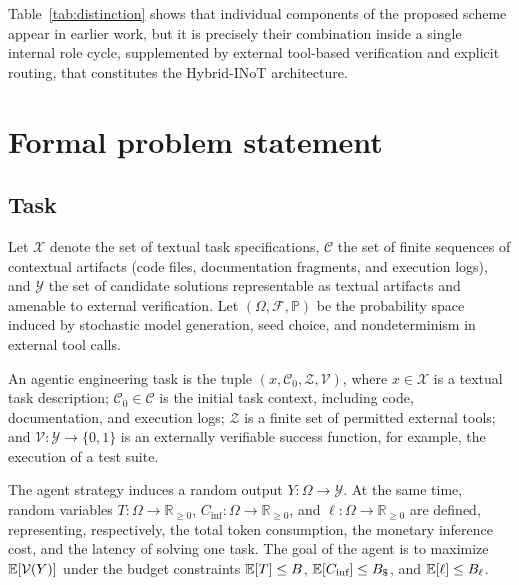 Table~\ref{tab:distinction} shows that individual components of the proposed scheme appear in earlier work, but it is precisely their combination inside a single internal role cycle, supplemented by external tool-based verification and explicit routing, that constitutes the Hybrid-INoT architecture.

\section{Formal problem statement}\label{sec:problem}

\subsection{Task}

Let $\mathcal{X}$ denote the set of textual task specifications, $\mathcal{C}$ the set of finite sequences of contextual artifacts (code files, documentation fragments, and execution logs), and $\mathcal{Y}$ the set of candidate solutions representable as textual artifacts and amenable to external verification. Let $(\Omega,\mathcal{F},\mathbb{P})$ be the probability space induced by stochastic model generation, seed choice, and nondeterminism in external tool calls.

\begin{definition}\label{def:task}
An agentic engineering task is the tuple $(x,\mathcal{C}_0,\mathcal{Z},\mathcal{V})$, where $x\in\mathcal{X}$ is a textual task description; $\mathcal{C}_0\in\mathcal{C}$ is the initial task context, including code, documentation, and execution logs; $\mathcal{Z}$ is a finite set of permitted external tools; and $\mathcal{V}:\mathcal{Y}\to\{0,1\}$ is an externally verifiable success function, for example, the execution of a test suite.
\end{definition}

The agent strategy induces a random output $Y:\Omega\to\mathcal{Y}$. At the same time, random variables $T:\Omega\to\mathbb{R}_{\ge 0}$, $C_{\text{inf}}:\Omega\to\mathbb{R}_{\ge 0}$, and $\ell:\Omega\to\mathbb{R}_{\ge 0}$ are defined, representing, respectively, the total token consumption, the monetary inference cost, and the latency of solving one task. The goal of the agent is to maximize $\mathbb{E}[\mathcal{V}(Y)]$ under the budget constraints $\mathbb{E}[T]\le B$, $\E[C_{\text{inf}}]\le B_\$$, and $\mathbb{E}[\ell]\le B_\ell$.


